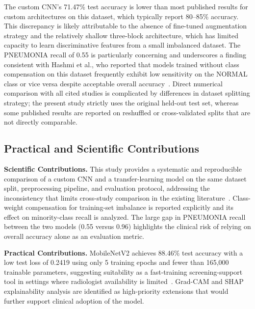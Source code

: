 \documentclass[preprint,12pt]{elsarticle}
\begin{document}
The custom CNN's 71.47\% test accuracy is lower than most published
results for custom architectures on this dataset, which typically
report 80--85\% accuracy.
This discrepancy is likely attributable to the absence of fine-tuned
augmentation strategy and the relatively shallow three-block
architecture, which has limited capacity to learn discriminative
features from a small imbalanced dataset.
The PNEUMONIA recall of 0.55 is particularly concerning and
underscores a finding consistent with Hashmi et al., who reported
that models trained without class compensation on this dataset
frequently exhibit low sensitivity on the NORMAL class or vice
versa despite acceptable overall accuracy~\cite{hashmi2020}.
Direct numerical comparison with all cited studies is complicated by
differences in dataset splitting strategy; the present study strictly
uses the original held-out test set, whereas some published results
are reported on reshuffled or cross-validated splits that are not
directly comparable.

\subsection{Practical and Scientific Contributions}
\textbf{Scientific Contributions.}
This study provides a systematic and reproducible comparison of a
custom CNN and a transfer-learning model on the same dataset split,
preprocessing pipeline, and evaluation protocol, addressing the
inconsistency that limits cross-study comparison in the existing
literature~\cite{hashmi2020,reshan2023}.
Class-weight compensation for training-set imbalance is reported
explicitly and its effect on minority-class recall is analyzed.
The large gap in PNEUMONIA recall between the two models (0.55 versus
0.96) highlights the clinical risk of relying on overall accuracy alone
as an evaluation metric.

\textbf{Practical Contributions.}
MobileNetV2 achieves 88.46\% test accuracy with a low test loss of
0.2419 using only 5 training epochs and fewer than 165{,}000 trainable
parameters, suggesting suitability as a fast-training screening-support
tool in settings where radiologist availability is limited~\cite{chouhan2020}.
Grad-CAM and SHAP explainability analysis are identified as high-priority
extensions that would further support clinical adoption of the model.

\end{document}
